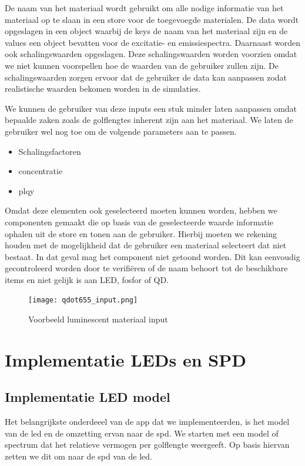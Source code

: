 De naam van het materiaal wordt gebruikt om alle nodige informatie van het materiaal op te slaan in een store voor de toegevoegde materialen. De data wordt opgeslagen in een object waarbij de keys de naam van het materiaal zijn en de values een object bevatten voor de excitatie- en emissiespectra. Daarnaast worden ook schalingswaarden opgeslagen. Deze schalingswaarden worden voorzien omdat we niet kunnen voorspellen hoe de waarden van de gebruiker zullen zijn. De schalingswaarden zorgen ervoor dat de gebruiker de data kan aanpassen zodat realistische waarden bekomen worden in de simulaties.

We kunnen de gebruiker van deze inputs een stuk minder laten aanpassen omdat bepaalde zaken zoals de golflengtes inherent zijn aan het materiaal. We laten de gebruiker wel nog toe om de volgende parameters aan te passen.

\begin{itemize}
    \item Schalingsfactoren
    \item concentratie
    \item \gls{plqy}
\end{itemize}

Omdat deze elementen ook geselecteerd moeten kunnen worden, hebben we componenten gemaakt die op basis van de geselecteerde waarde informatie ophalen uit de store en tonen aan de gebruiker. Hierbij moeten we rekening houden met de mogelijkheid dat de gebruiker een materiaal selecteert dat niet bestaat. In dat geval mag het component niet getoond worden. Dit kan eenvoudig gecontroleerd worden door te verifi\"eren of de naam behoort tot de beschikbare items en niet gelijk is aan LED, fosfor of QD.

\begin{figure}[H]
    \centering
    \texttt{[image: qdot655\_input.png]}
    \caption{Voorbeeld luminescent materiaal input}%
    \label{fig:luminescent_input}
\end{figure}

\section{Implementatie LEDs en SPD}

\subsection{Implementatie LED model}

Het belangrijkste onderdeeel van de app dat we implementeerden, is het model van de \gls{led} en de omzetting ervan naar de \gls{spd}. We starten met een model of spectrum dat het relatieve vermogen per golflengte weergeeft. Op basis hiervan zetten we dit om naar de \gls{spd} van de \gls{led}.

